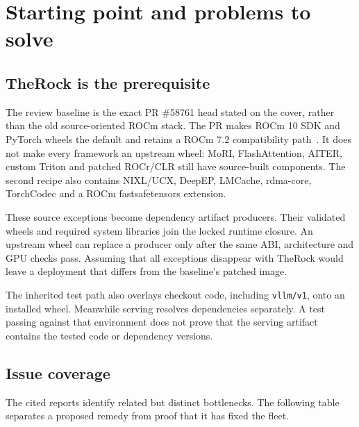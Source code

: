 \documentclass[11pt,a4paper]{article}
\newcommand{\file}[1]{\nolinkurl{#1}}
\begin{document}
\section{Starting point and problems to solve}

\subsection{TheRock is the prerequisite}

The review baseline is the exact PR \#58761 head stated on the cover, rather
than the old source-oriented ROCm stack. The PR makes ROCm 10 SDK and PyTorch
wheels the default and retains a ROCm 7.2 compatibility path~\cite{therock}.
It does not make every framework an upstream wheel: MoRI, FlashAttention,
AITER, custom Triton and patched ROCr/CLR still have source-built components.
The second recipe also contains NIXL/UCX, DeepEP, LMCache, rdma-core, TorchCodec
and a ROCm fastsafetensors extension.

These source exceptions become dependency artifact producers. Their validated
wheels and required system libraries join the locked runtime closure. An
upstream wheel can replace a producer only after the same ABI, architecture and
GPU checks pass. Assuming that all exceptions disappear with TheRock would
leave a deployment that differs from the baseline's patched image.

The inherited test path also overlays checkout code, including
\file{vllm/v1}, onto an installed wheel. Meanwhile serving resolves dependencies
separately. A test passing against that environment does not prove that the
serving artifact contains the tested code or dependency versions.

\subsection{Issue coverage}

The cited reports identify related but distinct bottlenecks. The following
table separates a proposed remedy from proof that it has fixed the fleet.
\end{document}

